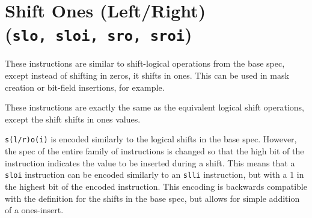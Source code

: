 %
%
%
%
%
%
%
%


\section{Shift Ones (Left/Right) (\texttt{slo,\ sloi,\ sro,\ sroi})}

These instructions are similar to shift-logical operations from the base
spec, except instead of shifting in zeros, it shifts in ones. This can
be used in mask creation or bit-field insertions, for example.

These instructions are exactly the same as the equivalent logical shift
operations, except the shift shifts in ones values.





\texttt{s(l/r)o(i)} is encoded similarly to the logical shifts in the
base spec. However, the spec of the entire family of instructions is
changed so that the high bit of the instruction indicates the value to
be inserted during a shift. This means that a \texttt{sloi} instruction
can be encoded similarly to an \texttt{slli} instruction, but with a 1
in the highest bit of the encoded instruction. This encoding is
backwards compatible with the definition for the shifts in the base
spec, but allows for simple addition of a ones-insert.


